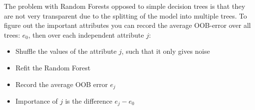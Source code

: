 The problem with Random Forests opposed to simple decision trees is
that they are not very transparent due to the splitting of the model
into multiple trees. To figure out the important attributes you can
record the average OOB-error over all trees: $e_0$, then over each
independent attribute $j$:

\begin{itemize}
  \item Shuffle the values of the attribute $j$, such that it only gives noise
  \item Refit the Random Forest
  \item Record the average OOB error $e_j$
  \item Importance of $j$ is the difference $e_j - e_0$
\end{itemize}

